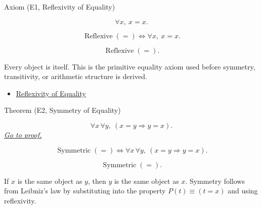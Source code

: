 \begin{axiombox}{Axiom (E1, Reflexivity of Equality)}
\begin{axiom}
\label{ax:equality-reflexivity}
\[
\forall x,\ x=x.
\]
\end{axiom}
\end{axiombox}

\begin{remark*}
\[
\operatorname{Reflexive}(=)
\Longleftrightarrow
\forall x,\ x=x.
\]
\end{remark*}

\begin{remark*}
\[
\operatorname{Reflexive}(=).
\]
\end{remark*}

\begin{remark*}[Interpretation]
Every object is itself. This is the primitive equality axiom used before
symmetry, transitivity, or arithmetic structure is derived.
\end{remark*}

\begin{dependencies}
\begin{itemize}
  \item \hyperref[ax:axiomatic-equality-reflexivity]{Reflexivity of Equality}
\end{itemize}
\end{dependencies}

\begin{theorembox}{Theorem (E2, Symmetry of Equality)}
\begin{theorem}
\label{thm:equality-symmetry}
\[
\forall x\,\forall y,\ (x=y \Longrightarrow y=x).
\]
\hyperref[prf:equality-symmetry]{\textit{Go to proof.}}
\end{theorem}
\end{theorembox}

\begin{remark*}
\[
\operatorname{Symmetric}(=)
\Longleftrightarrow
\forall x\,\forall y,\ (x=y \Longrightarrow y=x).
\]
\end{remark*}

\begin{remark*}
\[
\operatorname{Symmetric}(=).
\]
\end{remark*}

\begin{remark*}[Interpretation]
If $x$ is the same object as $y$, then $y$ is the same object as $x$.
Symmetry follows from Leibniz's law by substituting into the property
$P(t) \equiv (t=x)$ and using reflexivity.
\end{remark*}

